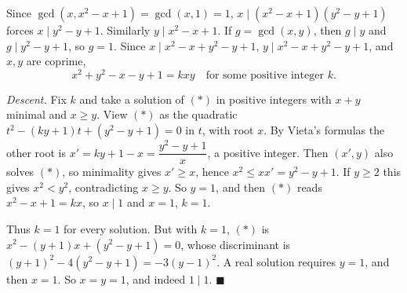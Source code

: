 Since $\gcd\left(x,x^2-x+1\right)=\gcd(x,1)=1$, $x\mid\left(x^2-x+1\right)\left(y^2-y+1\right)$ forces $x\mid y^2-y+1$. Similarly $y\mid x^2-x+1$. If $g=\gcd(x,y)$, then $g\mid y$ and $g\mid y^2-y+1$, so $g=1$. Since $x\mid x^2-x+y^2-y+1$, $y\mid x^2-x+y^2-y+1$, and $x,y$ are coprime,
\[x^2+y^2-x-y+1=kxy\quad\text{for some positive integer }k.\tag{$*$}\]

\emph{Descent.} Fix $k$ and take a solution of $(*)$ in positive integers with $x+y$ minimal and $x\ge y$. View $(*)$ as the quadratic $t^2-(ky+1)t+\left(y^2-y+1\right)=0$ in $t$, with root $x$. By Vieta's formulas the other root is $x'=ky+1-x=\dfrac{y^2-y+1}{x}$, a positive integer. Then $(x',y)$ also solves $(*)$, so minimality gives $x'\ge x$, hence $x^2\le xx'=y^2-y+1$. If $y\ge2$ this gives $x^2<y^2$, contradicting $x\ge y$. So $y=1$, and then $(*)$ reads $x^2-x+1=kx$, so $x\mid1$ and $x=1$, $k=1$.

Thus $k=1$ for every solution. But with $k=1$, $(*)$ is $x^2-(y+1)x+\left(y^2-y+1\right)=0$, whose discriminant is $(y+1)^2-4\left(y^2-y+1\right)=-3(y-1)^2$. A real solution requires $y=1$, and then $x=1$. So $x=y=1$, and indeed $1\mid1$. $\blacksquare$
